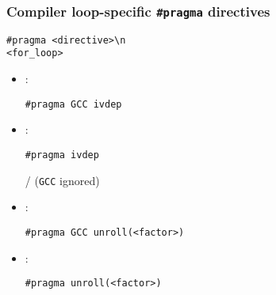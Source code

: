 \documentclass[14pt,aspectratio=169,dvipsnames,table]{beamer}
\begin{document}
\begin{frame}[fragile]
  \frametitle{Compiler loop-specific \texttt{\#pragma} directives}

\begin{lstlisting}
#pragma <directive>\n
<for_loop>
\end{lstlisting}

  \vskip 8pt

  \begin{itemize}[itemsep=5pt, topsep=6pt]
  \item \parbox{1.2cm}{}:
    \parbox{6cm}{\texttt{\#pragma GCC ivdep}}
    \href{https://godbolt.org/z/49qd16PTP}{\faCog}
    \raisebox{1pt}{$\Rightarrow$}
    \href{https://godbolt.org/z/fGvsTqo43}{\faCog}

  \item \parbox{1.2cm}{}:
    \parbox{6cm}{\texttt{\#pragma ivdep}}
    \href{https://godbolt.org/z/WcP6conYc}{\faCog}
    \raisebox{1pt}{$\Rightarrow$}
    \href{https://godbolt.org/z/8fc68x4ad}{\faCog}/%
    \href{https://godbolt.org/z/bKh1qYd1d}{\faCog}
    (\texttt{GCC} ignored)
  \end{itemize}

  \vskip 8pt
  \begin{itemize}[itemsep=5pt, topsep=6pt]
  \item \parbox{1.2cm}{}:
    \parbox{9cm}{\texttt{\#pragma GCC unroll(<factor>)}}
    \href{https://godbolt.org/z/3s1a5sh9G}{\faCog}
    \raisebox{1pt}{$\Rightarrow$}
    \href{https://godbolt.org/z/WxWeb8bnf}{\faCog}

  \item \parbox{1.2cm}{}:
    \parbox{9cm}{\texttt{\#pragma unroll(<factor>)}}
    \href{https://godbolt.org/z/Pos7vWErT}{\faCog}
    \raisebox{1pt}{$\Rightarrow$}
    \href{https://godbolt.org/z/36eMKf3Y1}{\faCog}
  \end{itemize}

\end{frame}
\end{document}
